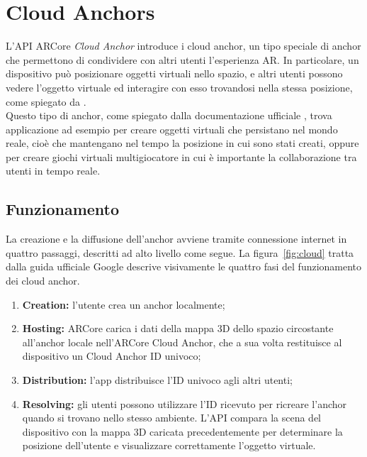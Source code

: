 \documentclass[crop=false, class=book]{standalone}
\newcommand\litem[1]{\item{\bfseries #1:}}
\begin{document}
	\chapter{Cloud Anchors}
	L'API ARCore \textit{Cloud Anchor} introduce i cloud anchor, un tipo speciale di anchor che permettono di condividere con altri utenti l'esperienza AR. In particolare, un dispositivo può posizionare oggetti virtuali nello spazio, e altri utenti possono vedere l'oggetto virtuale ed interagire con esso trovandosi nella stessa posizione, come spiegato da \cite{kert2021mobile}.
	\\
	Questo tipo di anchor, come spiegato dalla documentazione ufficiale \cite{google2022cloud}, trova applicazione ad esempio per creare oggetti virtuali che persistano nel mondo reale, cioè che mantengano nel tempo la posizione in cui sono stati creati, oppure per creare giochi virtuali multigiocatore in cui è importante la collaborazione tra utenti in tempo reale.
	
	\section{Funzionamento}
	La creazione e la diffusione dell'anchor avviene tramite connessione internet in quattro passaggi, descritti ad alto livello come segue. La figura~\vref{fig:cloud} tratta dalla guida ufficiale Google descrive visivamente le quattro fasi del funzionamento dei cloud anchor.
	\begin{enumerate}
		\litem{Creation} l'utente crea un anchor localmente;
		\litem{Hosting} ARCore carica i dati della mappa 3D dello spazio circostante all'anchor locale nell'ARCore Cloud Anchor, che a sua volta restituisce al dispositivo un Cloud Anchor ID univoco;
		\litem{Distribution} l'app distribuisce l'ID univoco agli altri utenti;
		\litem{Resolving} gli utenti possono utilizzare l'ID ricevuto per ricreare l'anchor quando si trovano nello stesso ambiente. L'API compara la scena del dispositivo con la mappa 3D caricata precedentemente per determinare la posizione dell'utente e visualizzare correttamente l'oggetto virtuale.
	\end{enumerate}
	
\end{document}
